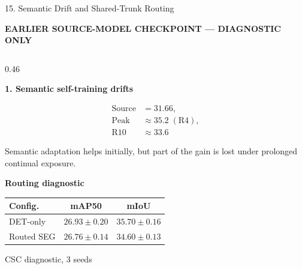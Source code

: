 \documentclass[aspectratio=169,11pt]{beamer}
\begin{document}
\begin{frame}{15. Semantic Drift and Shared-Trunk Routing}

\tiny
\setlength{\abovedisplayskip}{2pt}
\setlength{\belowdisplayskip}{2pt}
\setlength{\abovedisplayshortskip}{1pt}
\setlength{\belowdisplayshortskip}{1pt}

\textcolor{orange!80!black}{
\textbf{EARLIER SOURCE-MODEL CHECKPOINT --- DIAGNOSTIC ONLY}
}

\vspace{0.04cm}

\begin{columns}[T,onlytextwidth]

\begin{column}{0.46\textwidth}

\textbf{1. Semantic self-training drifts}

\[
\begin{aligned}
\text{Source} &= 31.66,\\
\text{Peak} &\approx 35.2 \;(\text{R4}),\\
\text{R10} &\approx 33.6
\end{aligned}
\]


Semantic adaptation helps initially, but part of the gain is lost
under prolonged continual exposure.

\vspace{0.08cm}

\textbf{Routing diagnostic}

\vspace{0.03cm}

\centering
\renewcommand{\arraystretch}{0.95}
\setlength{\tabcolsep}{3pt}

\begin{tabular}{lcc}
\toprule
\textbf{Config.} & \textbf{mAP50} & \textbf{mIoU} \\
\midrule
DET-only
& $26.93\pm0.20$
& $35.70\pm0.16$ \\
Routed SEG
& $26.76\pm0.14$
& $34.60\pm0.13$ \\
\bottomrule
\end{tabular}

\vspace{0.02cm}

{\fontsize{5.5}{6.2}\selectfont CSC diagnostic, 3 seeds}


\end{column}
\end{columns}
\end{frame}
\end{document}
